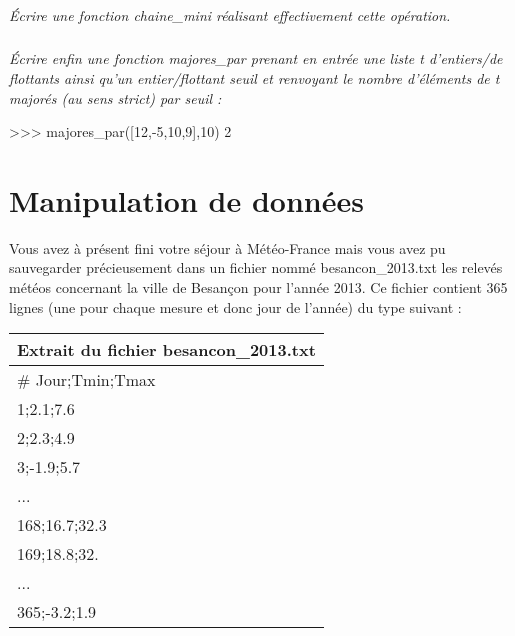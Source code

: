\documentclass[10pt]{article}
\newif\ifprof
\begin{document}
\subparagraph{}
\textit{Écrire une fonction \textsf{chaine\_mini} réalisant effectivement cette opération.}
\ifprof
\begin{corrige}
\begin{py}
\begin{python}
def chaine_mini(t):
    if len(t)==0:
        return None
    p = 0
    for i in range(len(t)):
        if t[i][1]<t[p][1]:
            p=i
    return t[p][0]
\end{python}
\end{py}
\end{corrige}
\else
\fi


\subparagraph{}
\textit{Écrire enfin une fonction \textsf{majores\_par} prenant en entrée une liste \textsf{t} d’entiers/de flottants ainsi qu’un
entier/flottant seuil et renvoyant le nombre d’éléments de \textsf{t} majorés (au sens strict) par seuil :}

\begin{py}
\begin{python}
>>> majores_par([12,-5,10,9],10)
            2
\end{python}
\end{py}
\ifprof
\begin{corrige}
\begin{py}
\begin{python}
def majores_par(t,):
    cpt = 0
    for i in range(len(t)):
        if t[i]<seuil:
            cpt = cpt+1
    return cpt
\end{python}
\end{py}
\end{corrige}
\else
\fi

\section{Manipulation de données}

Vous avez à présent fini votre séjour à Météo-France mais vous avez pu sauvegarder précieusement dans
un fichier nommé \textsf{besancon\_2013.txt} les relevés météos concernant la ville de Besançon pour l’année 2013.
Ce fichier contient 365 lignes (une pour chaque mesure et donc jour de l’année) du type suivant :
\begin{center}
\begin{tabular}{p{12cm}}
\hline
Extrait du fichier \textsf{besancon\_2013.txt} \\
\hline
\textsf{\# Jour;Tmin;Tmax}\\
\textsf{1;2.1;7.6}\\
\textsf{2;2.3;4.9}\\
\textsf{3;-1.9;5.7}\\
... \\
\textsf{168;16.7;32.3}\\
\textsf{169;18.8;32.}\\
... \\
\textsf{365;-3.2;1.9}\\
\hline
\end{tabular}
\end{center}
\end{document}
